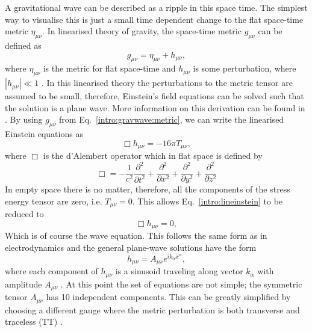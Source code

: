 A gravitational wave can be described as a ripple in this space time.
The simplest way to visualise this is just a small time dependent change to the flat space-time metric $\eta_{\mu\nu}$.
In linearised theory of gravity, the space-time metric $g_{\mu \nu}$ can be defined as
\begin{equation}
\label{intro:gravwave:metric}
    g_{\mu \nu} = \eta_{\mu \nu} + h_{\mu \nu},
\end{equation}
where $ \eta_{\mu \nu}$ is the metric for flat space-time and $h_{\mu \nu}$ is some perturbation, where $|h_{\mu \nu}| \ll 1$ \citep{flanagan2005BasicsGravitational}. 
In this linearised theory the perturbations to the metric tensor are assumed to be small, therefore, Einstein's field equations can be solved such that the solution is a plane wave. 
More information on this derivation can be found in \citep{flanagan2005BasicsGravitational,letiec2016TheoryGravitational}.
By using $g_{\mu \nu}$ from Eq.~\ref{intro:gravwave:metric}, we can write the linearised Einstein equations as
\begin{equation}
\label{intro:lineinstein}
    \Box h_{\mu \nu} = -16 \pi T_{\mu\nu},
\end{equation}
where $\Box$ is the d'Alembert operator which in flat space is defined by
\begin{equation}
		\Box = -\frac{1}{c^2} \frac{\partial^2}{\partial t^2} + \frac{\partial^2}{\partial x^2} + \frac{\partial^2}{\partial y^2} + \frac{\partial^2}{\partial z^2}
\end{equation}
In empty space there is no matter, therefore, all the components of the stress energy tensor  are zero, i.e. $T_{\mu \nu} = 0$.
This allows Eq.~\ref{intro:lineinstein} to be reduced to
\begin{equation}
    \Box h_{\mu \nu} = 0,
\end{equation}
Which is of course the wave equation. 
This follows the same form as in electrodynamics and the general plane-wave solutions have the form
\begin{equation}
    h_{\mu\nu} = A_{\mu\nu}e^{ik_{\alpha} x^{\alpha}},
\end{equation}
where each component of $h_{\mu \nu}$ is a sinusoid traveling along vector $k_{\alpha}$ with amplitude $A_{\mu\nu}$ \citep{capano2011SearchingGravitational}.
At this point the set of equations are not simple; the symmetric tensor $A_{\mu \nu}$ has 10 independent components.
This can be greatly simplified by choosing a different gauge where the metric perturbation is both transverse and traceless (TT) \citep{flanagan2005BasicsGravitational}.
